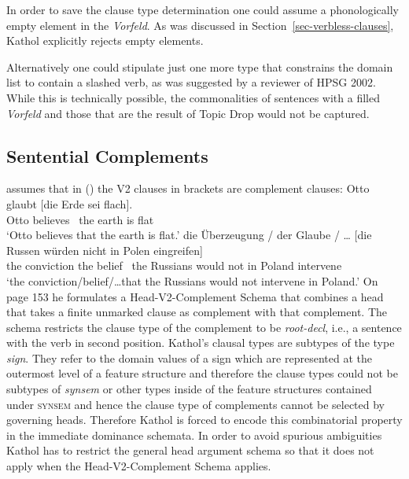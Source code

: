In order to save the clause type determination one could assume a phonologically empty element
in the \textit{Vorfeld}. As was discussed in Section~\ref{sec-verbless-clauses},
Kathol explicitly rejects empty elements.

Alternatively one could stipulate just one more type that constrains the domain list
to contain a slashed verb, as was suggested by a reviewer of HPSG 2002. While this is technically
possible, the commonalities of sentences with a filled \emph{Vorfeld} and those that are
the result of Topic Drop would not be captured.





\subsection{Sentential Complements}

\citet[p.\,152]{Kathol2000a} assumes that in () the V2 clauses in brackets
are complement clauses:
\eal
\ex
\gll Otto glaubt   [die Erde sei flach].\\
     Otto believes ~the earth is flat\\
\glt `Otto believes that the earth is flat.'
\ex\label{noun-scomp}
\gll die Überzeugung /  der Glaube / \ldots{} [die Russen würden nicht in Polen eingreifen]\footnotemark\\
     the conviction  {} the belief {} {}    ~the Russians would not in Poland intervene\\
\glt `the conviction/belief/\ldots that the Russians would not intervene in Poland.'
\zl
On page 153 he formulates a Head-V2-Complement Schema that combines a head that takes
a finite unmarked clause as complement with that complement. The schema restricts the
clause type of the complement to be {\it root-decl\/}, i.e., a sentence with the verb
in second position. Kathol's clausal types are subtypes of the type {\it sign\/}. They refer
to the domain values of a sign which are represented at the outermost level of a feature structure
and therefore the clause types could not be subtypes of {\it synsem\/}
or other types inside of the feature structures contained under \textsc{synsem} and hence
the clause type of complements cannot be selected by governing heads. Therefore
Kathol is forced to encode this combinatorial property in the immediate dominance schemata.
In order to avoid spurious ambiguities Kathol has to restrict the general head argument
schema so that it does not apply when the Head-V2-Complement Schema applies.

